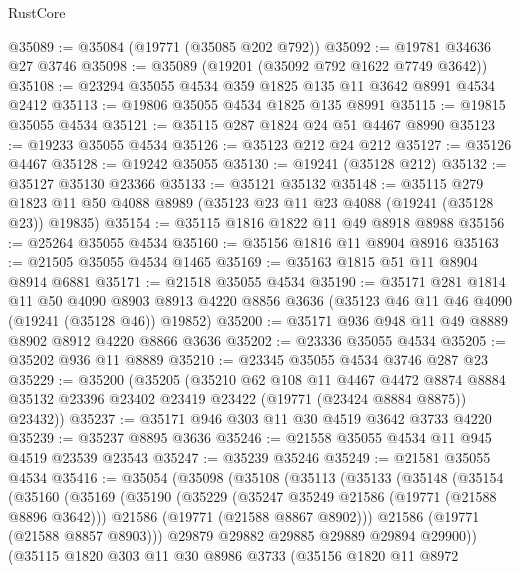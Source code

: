 \begin{lexlean}{RustCore}
\begin{coremodule}
@35089 := @35084 (@19771 (@35085 @202 @792))
@35092 := @19781 @34636 @27 @3746
@35098 := @35089 (@19201 (@35092 @792 @1622 @7749 @3642))
@35108 := @23294 @35055 @4534 @359 @1825 @135 @11 @3642 @8991 @4534 @2412
@35113 := @19806 @35055 @4534 @1825 @135 @8991
@35115 := @19815 @35055 @4534
@35121 := @35115 @287 @1824 @24 @51 @4467 @8990
@35123 := @19233 @35055 @4534
@35126 := @35123 @212 @24 @212
@35127 := @35126 @4467
@35128 := @19242 @35055
@35130 := @19241 (@35128 @212)
@35132 := @35127 @35130 @23366
@35133 := @35121 @35132
@35148 := @35115
    @279
    @1823
    @11
    @50
    @4088
    @8989
    (@35123 @23 @11 @23 @4088 (@19241 (@35128 @23)) @19835)
@35154 := @35115 @1816 @1822 @11 @49 @8918 @8988
@35156 := @25264 @35055 @4534
@35160 := @35156 @1816 @11 @8904 @8916
@35163 := @21505 @35055 @4534 @1465
@35169 := @35163 @1815 @51 @11 @8904 @8914 @6881
@35171 := @21518 @35055 @4534
@35190 := @35171
    @281
    @1814
    @11
    @50
    @4090
    @8903
    @8913
    @4220
    @8856
    @3636
    (@35123 @46 @11 @46 @4090 (@19241 (@35128 @46)) @19852)
@35200 := @35171 @936 @948 @11 @49 @8889 @8902 @8912 @4220 @8866 @3636
@35202 := @23336 @35055 @4534
@35205 := @35202 @936 @11 @8889
@35210 := @23345 @35055 @4534 @3746 @287 @23
@35229 := @35200
    (@35205
      (@35210
        @62
        @108
        @11
        @4467
        @4472
        @8874
        @8884
        @35132
        @23396
        @23402
        @23419
        @23422
        (@19771 (@23424 @8884 @8875))
        @23432))
@35237 := @35171 @946 @303 @11 @30 @4519 @3642 @3733 @4220
@35239 := @35237 @8895 @3636
@35246 := @21558 @35055 @4534 @11 @945 @4519 @23539 @23543
@35247 := @35239 @35246
@35249 := @21581 @35055 @4534
@35416 := @35054
    (@35098
      (@35108
        (@35113
          (@35133
            (@35148
              (@35154
                (@35160
                  (@35169
                    (@35190
                      (@35229
                        (@35247 @35249 @21586 (@19771 (@21588 @8896 @3642)))
                        @21586
                        (@19771 (@21588 @8867 @8902)))
                      @21586
                      (@19771 (@21588 @8857 @8903)))
                    @29879
                    @29882
                    @29885
                    @29889
                    @29894
                    @29900))
                (@35115
                  @1820
                  @303
                  @11
                  @30
                  @8986
                  @3733
                  (@35156
                    @1820
                    @11
                    @8972

\end{coremodule}
\end{lexlean}
